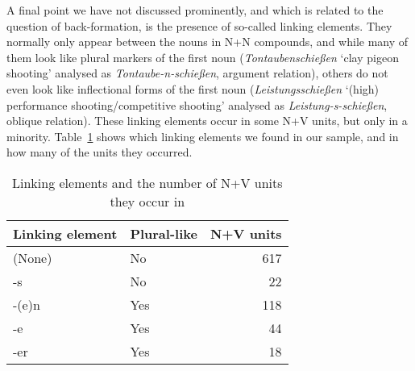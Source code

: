 \documentclass[biblatex, charis, linguex]{glossa}\usepackage{knitr}
\begin{document}
A final point we have not discussed prominently, and which is related to the question of back-formation, is the presence of so-called linking elements.
They normally only appear between the nouns in N+N compounds, and while many of them look like plural markers of the first noun (\textit{Tontaubenschießen} `clay pigeon shooting' analysed as \textit{Tontaube-n-schießen}, argument relation), others do not even look like inflectional forms of the first noun (\textit{Leistungsschießen} `(high) performance shooting\slash competitive shooting' analysed as \textit{Leistung-s-schießen}, oblique relation).
These linking elements occur in some N+V units, but only in a minority.
Table~\ref{tab:linkers} shows which linking elements we found in our sample, and in how many of the units they occurred.

\begin{table}[!htbp]
\centering
  \begin{tabular}{llr}
    \toprule
    Linking element & Plural-like & N+V units \\
    \midrule
    (None) & No  & 617 \\
    -s     & No  & 22 \\
    \midrule
    -(e)n  & Yes & 118 \\
    -e     & Yes & 44 \\
    -er    & Yes & 18 \\
    \bottomrule
  \end{tabular}
  \caption{Linking elements and the number of N+V units they occur in}
  \label{tab:linkers}
\end{table}
\end{document}
